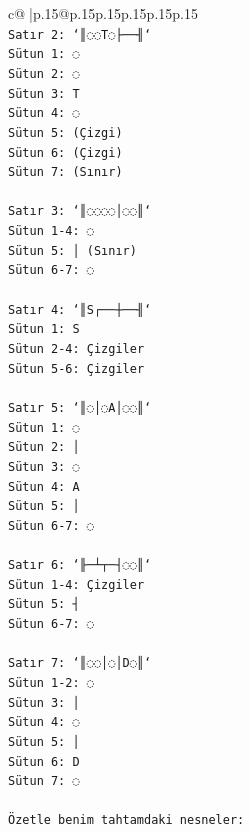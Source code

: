 \documentclass{article}
\begin{document}
{\begin{supertabular}{c@{$\;$}|p{.15\linewidth}@{}p{.15\linewidth}p{.15\linewidth}p{.15\linewidth}p{.15\linewidth}p{.15\linewidth}}
{{{\\ 
\texttt{Satır 2: `║◌◌T◌├──╢`} \\
\texttt{Sütun 1: ◌} \\
\texttt{Sütun 2: ◌} \\
\texttt{Sütun 3: T} \\
\texttt{Sütun 4: ◌} \\
\texttt{Sütun 5: (Çizgi)} \\
\texttt{Sütun 6: (Çizgi)} \\
\texttt{Sütun 7: (Sınır)} \\
\\ 
\texttt{Satır 3: `║◌◌◌◌│◌◌║`} \\
\texttt{Sütun 1{-}4: ◌} \\
\texttt{Sütun 5: │ (Sınır)} \\
\texttt{Sütun 6{-}7: ◌} \\
\\ 
\texttt{Satır 4: `║S┌──┼──╢`} \\
\texttt{Sütun 1: S} \\
\texttt{Sütun 2{-}4: Çizgiler} \\
\texttt{Sütun 5{-}6: Çizgiler} \\
\\ 
\texttt{Satır 5: `║◌│◌A│◌◌║`} \\
\texttt{Sütun 1: ◌} \\
\texttt{Sütun 2: │} \\
\texttt{Sütun 3: ◌} \\
\texttt{Sütun 4: A} \\
\texttt{Sütun 5: │} \\
\texttt{Sütun 6{-}7: ◌} \\
\\ 
\texttt{Satır 6: `╟─┴┬─┤◌◌║`} \\
\texttt{Sütun 1{-}4: Çizgiler} \\
\texttt{Sütun 5: ┤} \\
\texttt{Sütun 6{-}7: ◌} \\
\\ 
\texttt{Satır 7: `║◌◌│◌│D◌║`} \\
\texttt{Sütun 1{-}2: ◌} \\
\texttt{Sütun 3: │} \\
\texttt{Sütun 4: ◌} \\
\texttt{Sütun 5: │} \\
\texttt{Sütun 6: D} \\
\texttt{Sütun 7: ◌} \\
\\ 
\texttt{Özetle benim tahtamdaki nesneler:} \\
}}}
\end{supertabular}}
\end{document}
